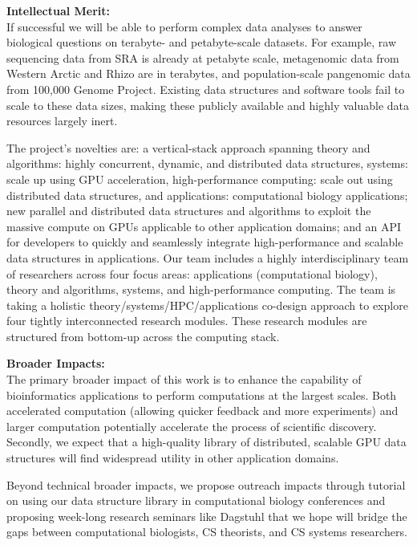 \noindent \textbf{\large Intellectual Merit:}\\
If successful we will be able to perform complex data analyses to answer biological questions on terabyte- and petabyte-scale datasets. For example, raw sequencing data from SRA  is already at petabyte scale, metagenomic data from Western Arctic and Rhizo are in terabytes, and population-scale pangenomic data from 100,000 Genome Project. Existing data structures and software tools fail to scale to these data sizes, making these publicly available and highly valuable data resources largely inert.

The project’s novelties are: a vertical-stack approach spanning theory and algorithms: highly concurrent, dynamic, and distributed data structures, systems: scale up using GPU acceleration, high-performance computing: scale out using distributed data structures, and applications: computational biology applications; new parallel and distributed data structures and algorithms to exploit the massive compute on GPUs applicable to other application domains; and an API for developers to quickly and seamlessly integrate high-performance and scalable data structures in applications.
%
Our team includes a highly interdisciplinary team of researchers across four focus areas: applications (computational biology), theory and algorithms, systems, and high-performance computing. The team is taking a holistic theory/systems/HPC/applications co-design approach to explore four tightly interconnected research modules. These research modules are structured from bottom-up across the computing stack.

\noindent \textbf{\large Broader Impacts: }\\
The primary broader impact of this work is to enhance the capability of bioinformatics applications to perform computations at the largest scales. Both accelerated computation (allowing quicker feedback and more experiments) and larger computation potentially accelerate the process of scientific discovery. Secondly, we expect that a high-quality library of distributed, scalable GPU data structures will find widespread utility in other application domains.

Beyond technical broader impacts, we propose outreach impacts through tutorial on using our data structure library in computational biology conferences and proposing week-long research seminars like Dagstuhl that we hope will bridge the gaps between computational biologists, CS theorists, and CS systems researchers.
